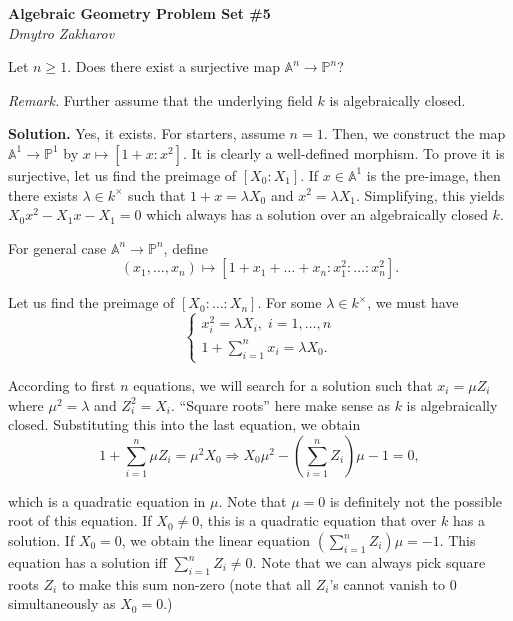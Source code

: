\documentclass{template}
\begin{document}
\begin{center}
    \Large \textcolor{blue!70!black}{\textbf{Algebraic Geometry Problem Set \#5}} \\
    \normalsize \textit{Dmytro Zakharov}
\end{center}

\begin{problem}[Exercise 1]
    Let $n \geq 1$. Does there exist a surjective map $\mathbb{A}^n \to \mathbb{P}^n$?
\end{problem}

\textit{Remark.} Further assume that the underlying field $k$ is algebraically closed.

\textbf{Solution.} Yes, it exists. For starters, assume $n=1$.
Then, we construct the map $\mathbb{A}^1 \to \mathbb{P}^1$ by $x \mapsto [1+x:x^2]$. 
It is clearly a well-defined morphism.
To prove it is surjective, let us find the preimage of $[X_0:X_1]$.
If $x \in \mathbb{A}^1$ is the pre-image, then there exists $\lambda \in k^{\times}$ such that $1+x=\lambda X_0$ and $x^2=\lambda X_1$.
Simplifying, this yields $X_0x^2-X_1x-X_1=0$ which always has a solution over an algebraically closed $k$.

For general case $\mathbb{A}^n \to \mathbb{P}^n$, define
\begin{equation*}
    (x_1,\dots,x_n) \mapsto [1+x_1+\dots+x_n:x_1^2:\dots:x_n^2].
\end{equation*}

Let us find the preimage of $[X_0:\dots:X_n]$. For some $\lambda \in k^{\times}$, we must have
\begin{equation*}
    \begin{cases}
        x_i^2 = \lambda X_i, \; i=1,\dots,n \\
        1+\sum_{i=1}^n x_i = \lambda X_0.
    \end{cases}
\end{equation*}

According to first $n$ equations, we will search for a solution such that $x_i=\mu Z_i$ where $\mu^2=\lambda$ and $Z_i^2=X_i$.
``Square roots'' here make sense as $k$ is algebraically closed. Substituting this into the last equation, we obtain
\begin{equation*}
    1+\sum_{i=1}^n \mu Z_i = \mu^2 X_0 \Rightarrow X_0\mu^2 - \left(\sum_{i=1}^n Z_i\right)\mu - 1 = 0,
\end{equation*}

which is a quadratic equation in $\mu$. Note that $\mu=0$ is definitely not the possible root of this equation.
If $X_0 \neq 0$, this is a quadratic equation that over $k$ has a solution.
If $X_0=0$, we obtain the linear equation $\left(\sum_{i=1}^n Z_i\right)\mu=-1$. 
This equation has a solution iff $\sum_{i=1}^n Z_i \neq 0$. 
Note that we can always pick square roots $Z_i$ to make this sum non-zero (note that all $Z_i$'s cannot vanish to $0$ simultaneously as $X_0=0$.)
\end{document}
